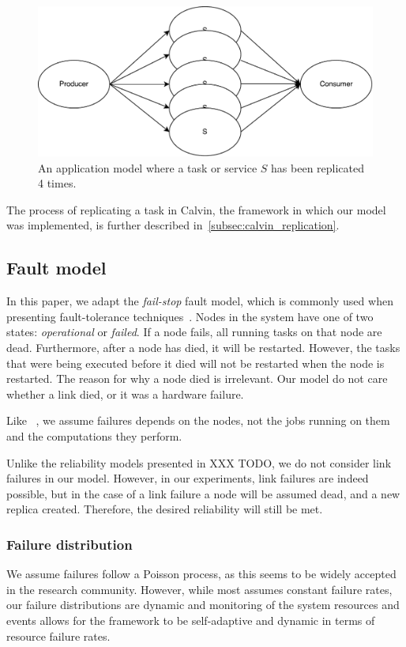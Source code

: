 \documentclass{cslthse-msc}
\begin{document}
\begin{figure}[!hbt]
\centering
\includegraphics[scale=0.5]{images/app_model_replication.pdf} 
\caption{An application model where a task or service $S$ has been replicated 4 times.}\label{fig:app_model_replication}
\end{figure}

The process of replicating a task in Calvin, the framework in which our model was implemented, is further described in~\cref{subsec:calvin_replication}.

\subsection{Fault model} \label{subsec:design_fault_model}
In this paper, we adapt the \emph{fail-stop} fault model, which is commonly used when presenting fault-tolerance techniques~\cite{surveyFaultParallel}. Nodes in the system have one of two states: \emph{operational} or \emph{failed}. If a node fails, all running tasks on that node are dead. Furthermore, after a node has died, it will be restarted. However, the tasks that were being executed before it died will not be restarted when the node is restarted. The reason for why a node died is irrelevant. Our model do not care whether a link died, or it was a hardware failure. 

Like ~\cite{selfAdaptRel}, we assume failures depends on the nodes, not the jobs running on them and the computations they perform.

Unlike the reliability models presented in XXX TODO, we do not consider link failures in our model. However, in our experiments, link failures are indeed possible, but in the case of a link failure a node will be assumed dead, and a new replica created. Therefore, the desired reliability will still be met. %


\subsubsection{Failure distribution}
We assume failures follow a Poisson process, as this seems to be widely accepted in the research community. However, while most assumes constant failure rates, our failure distributions are dynamic and monitoring of the system resources and events allows for the framework to be self-adaptive and dynamic in terms of resource failure rates.
\end{document}
